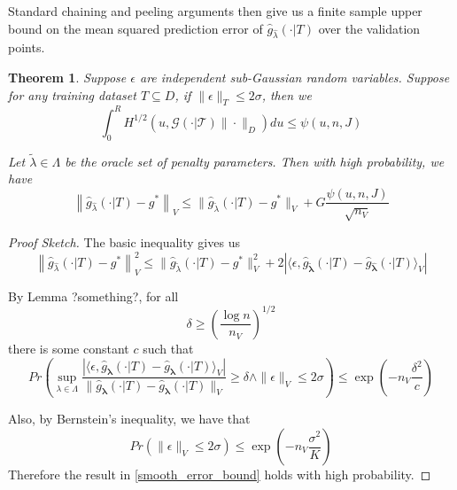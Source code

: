 \documentclass[12pt]{article}
\newtheorem{theorem}{Theorem}
\begin{document}
Standard chaining and peeling arguments then give us a finite sample upper bound on the mean squared prediction error of $\hat{g}_{\hat \lambda}(\cdot | T)$ over the validation points.

\begin{theorem}
\label{train_val_thrm}
Suppose $\epsilon$ are independent sub-Gaussian random variables. Suppose for any training dataset $T \subseteq D$, if $\| \epsilon \|_T \le 2 \sigma$, then we
\begin{equation}
\int_0^R H^{1/2} \left ( u, \mathcal{G(\cdot | T)} \| \cdot \|_D \right ) du \le \psi(u, n, J)
\end{equation}

Let $\tilde{\lambda} \in \Lambda$ be the oracle set of penalty parameters. Then with high probability, we have
\begin{equation}
\label{error_bound}
\left \|\hat{g}_{\hat{\lambda} }(\cdot | T) - g^* \right \|_V
\le 
\| \hat{g}_{\tilde{\lambda}}(\cdot | T) - g^*\|_V + G \frac{\psi(u, n, J)}{\sqrt{n_V}}
\end{equation}
\end{theorem}

\begin{proof}[Proof Sketch]

The basic inequality gives us
\begin{equation}
\left \|\hat{g}_{\hat{\lambda} }(\cdot | T) - g^* \right \|_V^2
\le
\| \hat{g}_{\tilde{\lambda}}(\cdot | T) - g^*\|_V^2 + 
2 \left | \langle \epsilon, \hat{g}_{\tilde{\boldsymbol \lambda}}(\cdot | T) - \hat{g}_{\hat{\boldsymbol \lambda}}(\cdot | T) \rangle_V \right |
\end{equation}

By Lemma ?something?, for all
\begin{equation}
\delta \ge \left ( \frac{\log n}{n_V} \right )^{1/2}
\end{equation}
there is some constant $c$ such that
\begin{equation}
Pr \left (
\sup_{\lambda \in \Lambda}
\frac {\left | \langle \epsilon, \hat{g}_{\boldsymbol \lambda}(\cdot | T) - \hat{g}_{\boldsymbol \lambda}(\cdot | T) \rangle_V \right |}{\| \hat{g}_{\boldsymbol \lambda}(\cdot | T) - \hat{g}_{\boldsymbol \lambda}(\cdot | T) \|_V}
\ge \delta 
\wedge
\| \epsilon \|_V \le 2 \sigma
\right ) 
\le \exp \left ( - n_V \frac{\delta^2}{c} \right )
\end{equation}

Also, by Bernstein's inequality, we have that
\begin{equation}
Pr \left ( \| \epsilon \|_V \le 2 \sigma \right ) 
\le
\exp \left ( - n_V \frac{\sigma^2}{K} \right )
\end{equation}
Therefore the result in \eqref{smooth_error_bound} holds with high probability.
\end{proof}
\end{document}
